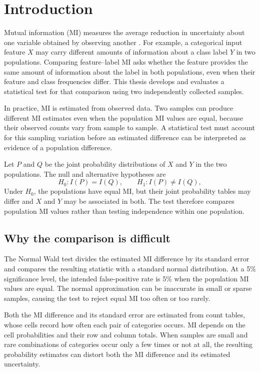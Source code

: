 \chapter{Introduction}
\label{chap:introduction}

Mutual information (MI) measures the average reduction in uncertainty about
one variable obtained by observing another \citep{bossomaier2016}.
For example, a categorical input feature
\(X\) may carry different amounts of information about a class label \(Y\) in two
populations. Comparing feature--label MI asks whether the feature provides
the same amount of information about the label in both populations,
even when their feature and class
frequencies differ. This thesis develops and evaluates a statistical test
for that comparison using two independently collected samples.

In practice, MI is estimated from observed data. Two samples can produce
different MI estimates even when the population MI values are equal,
because their observed counts vary from sample to sample. A statistical
test must account for this sampling variation before an estimated
difference can be interpreted as evidence of a population difference.

Let \(P\) and \(Q\) be the joint probability distributions of \(X\) and
\(Y\) in the two populations. The null and alternative hypotheses are
\begin{equation}
  H_0:I(P)=I(Q),
  \qquad H_1:I(P)\ne I(Q),
  \label{eq:introduction-null}
\end{equation}
Under \(H_0\), the populations have equal MI, but their joint probability
tables may differ and \(X\) and \(Y\) may be associated in both. The test
therefore compares population MI values rather than
testing independence within one population.

\section{Why the comparison is difficult}

The Normal Wald test \citep{wald1943,vanderVaart1998} divides the estimated
MI difference by its standard error and compares the resulting statistic
with a standard normal distribution. At a 5\% significance level, the
intended false-positive rate is 5\% when the population MI values are
equal. The normal
approximation can be inaccurate in small or sparse samples, causing the
test to reject equal MI too often or too rarely.

Both the MI difference and its standard error are estimated from count
tables, whose cells record how often each pair of categories occurs.
MI depends on the cell probabilities and their row and column totals.
When samples are small and rare combinations of categories occur only a
few times or not at all, the resulting probability estimates can distort
both the MI difference and its estimated uncertainty.

